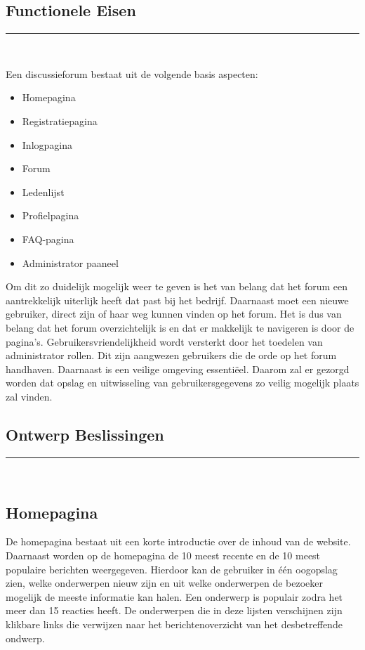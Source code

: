 \documentclass[a4paper,12pt]{article}
\newcommand{\HRule}{\rule{\linewidth}{0.5mm}}
\begin{document}
\begin{center}
\section[Functionele eisen]{Functionele Eisen}
\HRule \\[0.5cm]
\end{center}
Een discussieforum bestaat uit de volgende basis aspecten:
\begin{itemize}
\item Homepagina
\item Registratiepagina
\item Inlogpagina
\item Forum
\item Ledenlijst
\item Profielpagina
\item FAQ-pagina
\item Administrator paaneel
\end{itemize}

Om dit zo duidelijk mogelijk weer te geven is het van belang dat het forum een aantrekkelijk uiterlijk heeft dat past bij het bedrijf. Daarnaast moet een nieuwe gebruiker, direct zijn of haar weg kunnen vinden op het forum. Het is dus van belang dat het forum overzichtelijk is en dat er makkelijk te navigeren is door de pagina's. Gebruikersvriendelijkheid wordt versterkt door het toedelen van administrator rollen. Dit zijn aangwezen gebruikers die de orde op het forum handhaven. Daarnaast is een veilige omgeving essenti\"eel. Daarom zal er gezorgd worden dat opslag en uitwisseling van gebruikersgegevens zo veilig mogelijk plaats zal vinden.


\begin{center}
\section[Ontwerp Beslissingen]{Ontwerp Beslissingen}
\HRule \\[0.5cm]
\end{center}
\subsection[Homepagina]{Homepagina}
De homepagina bestaat uit een korte introductie over de inhoud van de website. Daarnaast worden op de homepagina de 10 meest recente en de 10 meest populaire berichten weergegeven. Hierdoor kan de gebruiker in \'e\'en oogopslag zien, welke onderwerpen nieuw zijn en uit welke onderwerpen de bezoeker mogelijk de meeste informatie kan halen. Een onderwerp is populair zodra het meer dan 15 reacties heeft. De onderwerpen die in deze lijsten verschijnen zijn klikbare links die verwijzen naar het berichtenoverzicht van het desbetreffende ondwerp.\\
\end{document}

